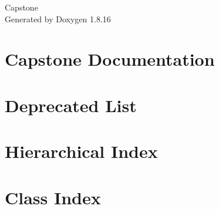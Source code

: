 \let\mypdfximage\pdfximage\def\pdfximage{\immediate\mypdfximage}\documentclass[twoside]{book}
\newcommand{\+}{\discretionary{\mbox{\scriptsize$\hookleftarrow$}}{}{}}
\newcommand{\clearemptydoublepage}{%
  \newpage{\pagestyle{empty}\cleardoublepage}%
}
\begin{document}
\hypersetup{pageanchor=false,
             bookmarksnumbered=true,
             pdfencoding=unicode
            }
\begin{titlepage}
\vspace*{7cm}
\begin{center}%
{\Large Capstone }\\
\vspace*{1cm}
{\large Generated by Doxygen 1.8.16}\\
\end{center}
\end{titlepage}
\clearemptydoublepage
{}
\tableofcontents
\clearemptydoublepage
{}
\hypersetup{pageanchor=true}

\chapter{Capstone Documentation}
\label{index}\hypertarget{index}{}
\chapter{Deprecated List}
\label{deprecated}

\chapter{Hierarchical Index}

\chapter{Class Index}

\end{document}
